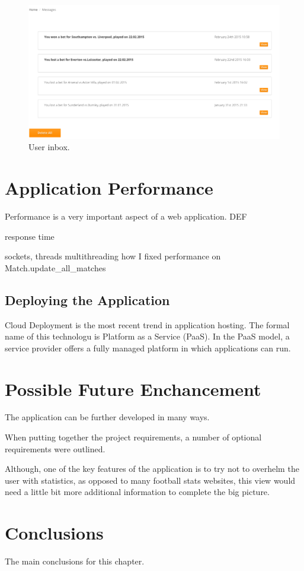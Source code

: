 \begin{figure}[H]
	\begin{center}
		\includegraphics[width=.90\linewidth,natwidth=610,natheight=642]{impl/images/inbox}
		\caption{User inbox.} \label{fig:using: inbox}
	\end{center}
\end{figure}


\section{Application Performance}
\label{sec:applicationperformance}
Performance is a very important aspect of a web application. DEF 

response time 

sockets, threads
multithreading
how I fixed performance on Match.update\_all\_matches

\subsection{Deploying the Application}
Cloud Deployment is the most recent trend in application hosting. The formal name of this technologu is Platform as a Service (PaaS).  In the PaaS model, a service provider offers a fully managed platform in which applications can run.

\section{Possible Future Enchancement}
\label{sec:enchancement}
The application can be further developed in many ways.  

When putting together the project requirements, a number of optional requirements were outlined. 

Although, one of the key features of the application is to try not to overhelm the user with statistics, as opposed to many football stats websites, this view would need a little bit more additional information to complete the big picture.

\section{Conclusions}
The main conclusions for this chapter.